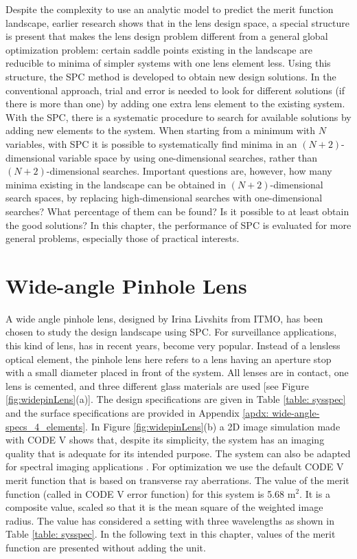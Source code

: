 Despite the complexity to use an analytic model to predict the merit function landscape, earlier research shows \cite{BociortSPCSexplained}\cite{MVTurnhoutSPC15} that in the lens design space, a special structure is present that makes the lens design problem different from a general global optimization problem: certain saddle points existing in the landscape are reducible to minima of simpler systems with one lens element less. Using this structure, the SPC \cite{MVTurnhoutSPC15} method is developed to obtain new design solutions. In the conventional approach, trial and error is needed to look for different solutions (if there is more than one) by adding one extra lens element to the existing system. With the SPC, there is a systematic procedure to search for available solutions by adding new elements to the system. When starting from a minimum with $N$ variables, with SPC it is possible to systematically find minima in an $(N+2)$-dimensional variable space by using one-dimensional searches, rather than $(N+2)$-dimensional searches. Important questions are, however, how many minima existing in the landscape can be obtained in $(N+2)$-dimensional search spaces, by replacing high-dimensional searches with one-dimensional searches? What percentage of them can be found? Is it possible to at least obtain the good solutions? In this chapter, the performance of SPC is evaluated for more general problems, especially those of practical interests. 


\section{Wide-angle Pinhole Lens}

A wide angle pinhole lens, designed by Irina Livshits from ITMO, has been chosen to study the design landscape using SPC. For surveillance applications, this kind of lens, has in recent years, become very popular. Instead of a lensless optical element, the pinhole lens here refers to a lens having an aperture stop with a small diameter placed in front of the system. All lenses are in contact, one lens is cemented, and three different glass materials are used [see Figure \ref{fig:widepinLens}(a)]. The design specifications are given in Table \ref{table: sysspec} and the surface specifications are provided in Appendix \ref{apdx: wide-angle-specs_4_elements}. In Figure \ref{fig:widepinLens}(b) a 2D image simulation made with CODE V shows that, despite its simplicity, the system has an imaging quality that is adequate for its intended purpose. The system can also be adapted for spectral imaging applications \cite{Strauch2015}. For optimization we use the default CODE V merit function that is based on transverse ray aberrations. The value of the merit function (called in CODE V error function) for this system is 5.68 \textmu m$^2$. It is a composite value, scaled so that it is the mean square of the weighted image radius. The value has considered a setting with three wavelengths as shown in Table \ref{table: sysspec}. In the following text in this chapter, values of the merit function are presented without adding the unit. 

